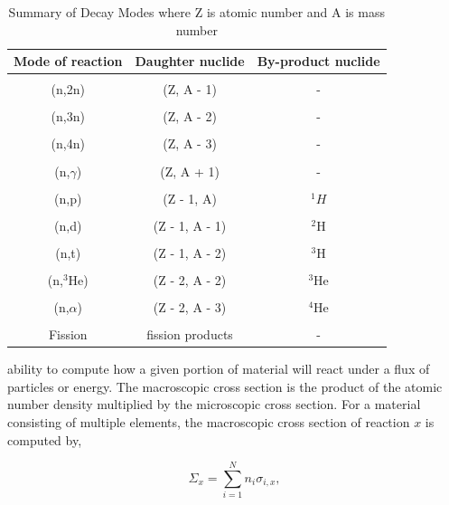 \begin{table}[p]
    \caption{\label{tab:reactionModes} Summary of Decay Modes where Z is atomic number and A is mass number \cite{pusaThesis}}
    \centering
    \begin{tabular}{c|c|c}
    \hline
    \textbf{Mode of reaction} & \textbf{Daughter nuclide} & \textbf{By-product nuclide} \\ [0.5ex] 
    \hline
    \hline
    \\ [-1em]
    (n,2n) & (Z, A - 1) & - \\ \hline 
    \\ [-1em]
    (n,3n) & (Z, A - 2) & - \\ \hline 
    \\ [-1em]
    (n,4n) & (Z, A - 3) & - \\ \hline 
    \\ [-1em]
    (n,$\gamma$) & (Z, A + 1) & - \\ \hline 
    \\ [-1em]
    (n,p) & (Z - 1, A) & ${}^{1}H$ \\ \hline 
    \\ [-1em]
    (n,d) & (Z - 1, A - 1) & ${}^{2}$H \\ \hline 
    \\ [-1em]
    (n,t) & (Z - 1, A - 2) & ${}^{3}$H \\ \hline 
    \\ [-1em]
    (n,${}^{3}$He) & (Z - 2, A - 2) & ${}^{3}$He \\ \hline 
    \\ [-1em]
    (n,$\alpha$) & (Z - 2, A - 3) & ${}^{4}$He \\ \hline 
    \\ [-1em]
    Fission & fission products & - \\ \hline
    \end{tabular}
\end{table}

\clearpage

\noindent ability to compute how a given portion of material will react under a flux of particles or energy. The macroscopic cross section is the product of the atomic number density multiplied by the microscopic cross section. For a material consisting of multiple elements, the macroscopic cross section of reaction $x$ is computed by,

\begin{equation}
    \Sigma_{x} = \sum_{i=1}^{N}n_{i}\sigma_{i,x},
\end{equation}

